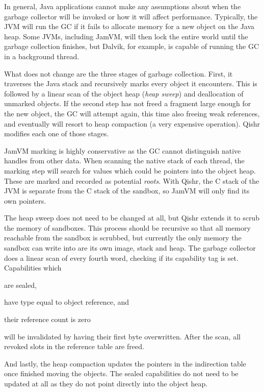 \documentclass[a4paper,12pt,twoside,openright]{report}
\begin{document}
In general, Java applications cannot make any assumptions about when the garbage collector will be invoked or how it will affect performance. Typically, the JVM will run the GC if it fails to allocate memory for a new object on the Java heap. Some JVMs, including JamVM, will then lock the entire world until the garbage collection finishes, but Dalvik, for example, is capable of running the GC in a background thread. 

What does not change are the three stages of garbage collection. First, it traverses the Java stack and recursively marks every object it encounters. This is followed by a linear scan of the object heap (\emph{heap sweep}) and deallocation of unmarked objects. If the second step has not freed a fragment large enough for the new object, the GC will attempt again, this time also freeing weak references, and eventually will resort to heap compaction (a very expensive operation). Qishr modifies each one of those stages.

JamVM marking is highly conservative as the GC cannot distinguish native handles from other data. When scanning the native stack of each thread, the marking step will search for values which could be pointers into the object heap. These are marked and recorded as potential \emph{roots}. With Qishr, the C stack of the JVM is separate from the C stack of the sandbox, so JamVM will only find its own pointers.

The heap sweep does not need to be changed at all, but Qishr extends it to scrub the memory of sandboxes. This process should be recursive so that all memory reachable from the sandbox is scrubbed, but currently the only memory the sandbox can write into are its own image, stack and heap. The garbage collector does a linear scan of every fourth word, checking if its capability tag is set. Capabilities which 
\begin{inparaenum}
\item are sealed,
\item have type equal to object reference, and
\item their reference count is zero
\end{inparaenum}
will be invalidated by having their first byte overwritten. After the scan, all revoked slots in the reference table are freed.

And lastly, the heap compaction updates the pointers in the indirection table once finished moving the objects. The sealed capabilities do not need to be updated at all as they do not point directly into the object heap.
\end{document}
